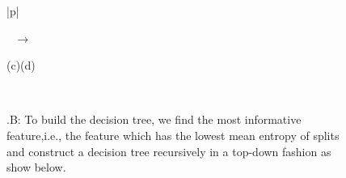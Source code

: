\begin{figure}[pt]
{\begin{tabular}{|p{\linewidth}|}
\begin{minipage}[c]{\linewidth}
\begin{minipage}[c]{\linewidth}
\end{minipage}
\begin{minipage}[c]{0.4\linewidth}
\end{minipage}$~~~\longrightarrow~~~$\begin{minipage}[c]{0.45\linewidth}
\end{minipage}
\begin{minipage}[c]{\linewidth}
\centering
(c)\hspace{0.5\linewidth}(d)
\end{minipage}\vspace{0.4em}
\end{minipage}\bigstrut\\\hline\vspace{-0.5em}
\begin{minipage}[c]{\linewidth}
.B: To build the decision tree, we find the most informative feature,i.e., the feature which has the lowest mean entropy of splits and construct a decision tree recursively in a top-down fashion as show below.\\
\begin{minipage}[c]{\linewidth}
\begin{minipage}[c]{0.5\textwidth}

\end{minipage}
\end{minipage}
\end{minipage}
\end{tabular}}
\end{figure}
